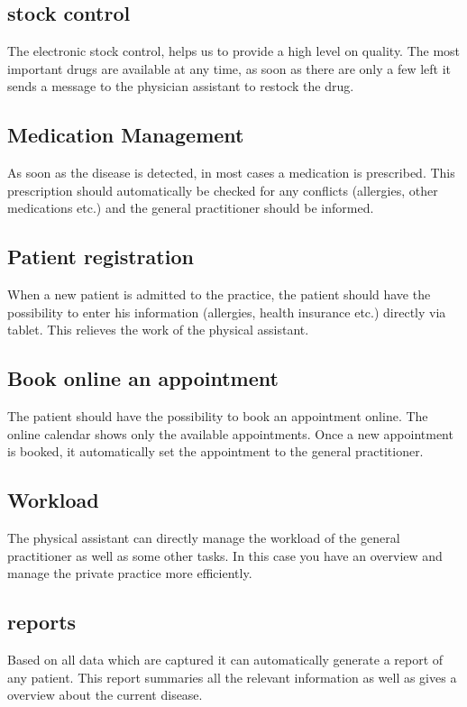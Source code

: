 \documentclass{report}
\begin{document}
\subsection{stock control}
The electronic stock control, helps us to provide a high level on quality. The most important drugs are available at any time, as soon as there are only a few left it sends a message to the physician assistant to restock the drug. 

\subsection{Medication Management}
As soon as the disease is detected, in most cases a medication is prescribed. This prescription should automatically be checked for any conflicts (allergies, other medications etc.) and the general practitioner should be informed.

\subsection{Patient registration}
When a new patient is admitted to the practice, the patient should have the possibility to enter his information (allergies, health insurance etc.) directly via tablet. This relieves the work of the physical assistant.

\subsection{Book online an appointment}
The patient should have the possibility to book an appointment online. The online calendar shows only the available appointments. Once a new appointment is booked, it automatically set the appointment to the general practitioner.

\subsection{Workload}
The physical assistant can directly manage the workload of the general practitioner as well as some other tasks. In this case you have an overview and manage the private practice more efficiently.

\subsection{reports}
Based on all data which are captured it can automatically generate a report of any patient. This report summaries all the relevant information as well as gives a overview about the current disease.
\end{document}
